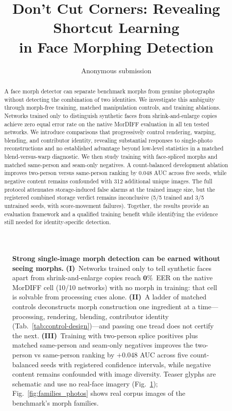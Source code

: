 \documentclass[10pt,twocolumn,letterpaper]{article}
\title{Don't Cut Corners: Revealing Shortcut Learning\\in Face Morphing Detection}
\author{Anonymous submission}
\begin{document}
\maketitle
\ifTeaserEnabled
\begin{figure}[t]
\centering

\caption{\textbf{Strong single-image morph detection can be earned without seeing morphs.}
\textbf{(I)}~Networks trained only to tell synthetic faces apart from shrink-and-enlarge copies reach $\mathbf{0\%}$~EER on the native MorDIFF cell (10/10 networks) with no morph in training: that cell is solvable from processing cues alone.
\textbf{(II)}~A ladder of matched controls deconstructs morph construction one ingredient at a time---processing, rendering, blending, contributor identity (Tab.~\ref{tab:control-design})---and passing one tread does not certify the next.
\textbf{(III)}~Training with two-person splice positives plus matched same-person and seam-only negatives improves the two-person vs same-person ranking by $+0.048$ AUC across five count-balanced seeds with registered confidence intervals, while negative content remains confounded with image diversity. Teaser glyphs are schematic and use no real-face imagery (Fig.~\ref{fig:teaser}); Fig.~\ref{fig:families_photos} shows real corpus images of the benchmark's morph families.}
\label{fig:teaser}
\end{figure}
\fi
\begin{abstract}
A face morph detector can separate benchmark morphs from genuine photographs without detecting the combination of two identities. We investigate this ambiguity through morph-free training, matched manipulation controls, and training ablations. Networks trained only to distinguish synthetic faces from shrink-and-enlarge copies achieve zero equal error rate on the native MorDIFF evaluation in all ten tested networks. We introduce comparisons that progressively control rendering, warping, blending, and contributor identity, revealing substantial responses to single-photo reconstructions and no established advantage beyond low-level statistics in a matched blend-versus-warp diagnostic. We then study training with face-spliced morphs and matched same-person and seam-only negatives. A count-balanced development ablation improves two-person versus same-person ranking by 0.048 AUC across five seeds, while negative content remains confounded with 312 additional unique images. The full protocol attenuates storage-induced false alarms at the trained image size, but the registered combined storage verdict remains inconclusive (5/5 trained and 3/5 untrained seeds, with score-movement failures). Together, the results provide an evaluation framework and a qualified training benefit while identifying the evidence still needed for identity-specific detection.
\end{abstract}
\end{document}
